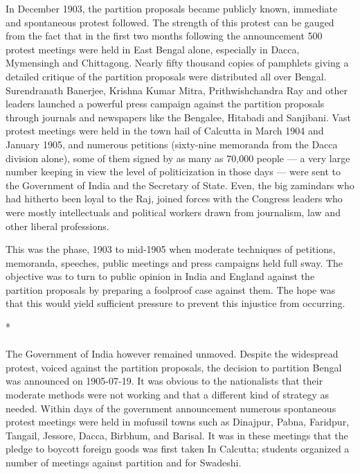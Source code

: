 In December 1903, the partition proposals became publicly known, immediate and spontaneous protest followed. The strength of this protest can be gauged from the fact that in the first two months following the announcement 500 protest meetings were held in East Bengal alone, especially in Dacca, Mymensingh and Chittagong. Nearly fifty thousand copies of pamphlets giving a detailed critique of the partition proposals were distributed all over Bengal. Surendranath Banerjee, Krishna Kumar Mitra, Prithwishchandra Ray and other leaders launched a powerful press campaign against the partition proposals through journals and newspapers like the Bengalee, Hitabadi and Sanjibani. Vast protest meetings were held in the town hail of Calcutta in March 1904 and January 1905, and numerous petitions (sixty-nine memoranda from the Dacca division alone), some of them signed by as many as 70,000 people --- a very large number keeping in view the level of politicization in those days --- were sent to the Government of India and the Secretary of State. Even, the big zamindars who had hitherto been loyal to the Raj, joined forces with the Congress leaders who were mostly intellectuals and political workers drawn from journalism, law and other liberal professions.

This was the phase, 1903 to mid-1905 when moderate techniques of petitions, memoranda, speeches, public meetings and press campaigns held full sway. The objective was to turn to public opinion in India and England against the partition proposals by preparing a foolproof case against them. The hope was that this would yield sufficient pressure to prevent this injustice from occurring.

\begin{center}*\end{center}

\paragraph*{}

The Government of India however remained unmoved. Despite the widespread protest, voiced against the partition proposals, the decision to partition Bengal was announced on 1905-07-19. It was obvious to the nationalists that their moderate methods were not working and that a different kind of strategy as needed. Within days of the government announcement numerous spontaneous protest meetings were held in mofussil towns such as Dinajpur, Pabna, Faridpur, Tangail, Jessore, Dacca, Birbhum, and Barisal. It was in these meetings that the pledge to boycott foreign goods was first taken In Calcutta; students organized a number of meetings against partition and for Swadeshi.

